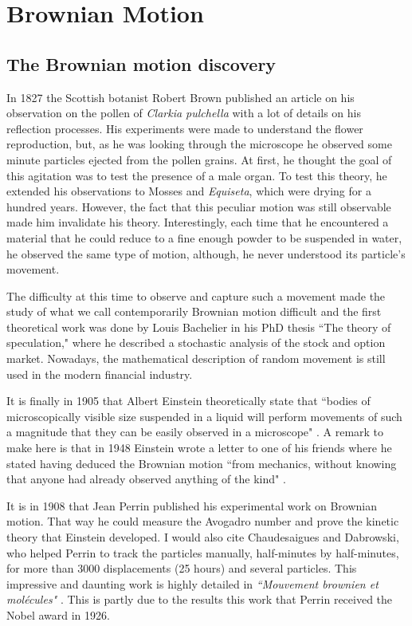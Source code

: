 \section{Brownian Motion}
\label{sec:chapter1}

\subsection{The Brownian motion discovery}



In 1827 the Scottish botanist Robert Brown published an article \cite{robert_xxvii_1828} on his observation on the pollen of \textit{Clarkia pulchella} with a lot of details on his reflection processes. His experiments were made to understand the flower reproduction, but, as he was looking through the microscope he observed some minute particles ejected from the pollen grains. At first, he thought the goal of this agitation was to test the presence of a male organ. To test this theory, he extended his observations to Mosses and \textit{Equiseta}, which were drying for a hundred years. However, the fact that this peculiar motion was still observable made him invalidate his theory. Interestingly, each time that he encountered a material that he could reduce to a fine enough powder to be suspended in water, he observed the same type of motion, although, he never understood its particle's movement.

The difficulty at this time to observe and capture such a movement made the study of what we call contemporarily Brownian motion difficult and the first theoretical work was done by Louis Bachelier in his PhD thesis ``The theory of speculation," where he described a stochastic analysis of the stock and option market. Nowadays, the mathematical description of random movement is still used in the modern financial industry. 

It is finally in 1905 that Albert Einstein theoretically state that ``bodies of microscopically visible size suspended in a liquid will perform movements of such a magnitude that they can be easily observed in a microscope" \cite{einstein_uber_1905}. A remark to make here is that in 1948 Einstein wrote a letter to one of his friends where he stated having deduced the Brownian motion ``from mechanics, without knowing that anyone had already observed anything of the kind" \cite{peter_brownian_nodate}.

It is in 1908 that Jean Perrin published his experimental work on Brownian motion. That way he could measure the Avogadro number and prove the kinetic theory that Einstein developed. I would also cite Chaudesaigues and Dabrowski, who helped Perrin to track the particles manually, half-minutes by half-minutes, for more than 3000 displacements (25 hours) and several particles. This impressive and daunting work is highly detailed in \textit{``Mouvement brownien et molécules"} \cite{perrin_mouvement_1910}. This is partly due to the results this work that Perrin received the Nobel award in 1926.


